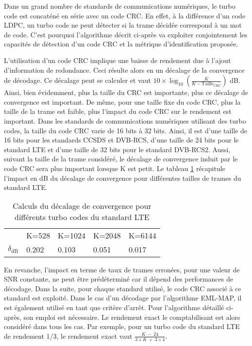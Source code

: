 Dans un grand nombre de standards de communications numériques, le turbo code est concaténé en série avec un code CRC. En 
effet, à la différence d'un code LDPC, un turbo code ne peut détecter si la trame décidée correspond à un mot de code. 
C'est pourquoi l'algorithme  décrit ci-après va exploiter conjointement les capacités de détection d'un code CRC et la métrique 
d'identification proposée.

L'utilisation d'un code CRC implique une baisse de rendement due à l'ajout d'information de redondance. Ceci résulte alors 
en un décalage de la convergence de décodage. Ce décalage peut se calculer et vaut $10\times \log_{10}\left(\frac{K}{K-\text{Taille}_\text{CRC}}\right)$ dB.
Ainsi, bien évidemment, plus la taille du CRC est importante, plus ce décalage de convergence est important. De même,
pour une taille fixe du code CRC, plus la taille de la trame est faible, plus l'impact du code CRC sur le rendement est 
important. Dans les 
standards de communications numériques utilisant des turbo codes, la taille du code CRC varie de 16 bits à 32 bits.
Ainsi, il est d'une taille de 16 bits pour les standards CCSDS et DVB-RCS, d'une taille de 24 bits pour le standard LTE et d'une taille
de 32 bits pour le standard DVB-RCS2. Aussi, suivant la taille de la trame considéré, le décalage de convergence induit par le code 
CRC sera plus important lorsque K est petit. Le tableau \ref{tab:crcShift} récapitule l'impact en dB du décalage de convergence
pour différentes tailles de trames du standard LTE. 

\begin{table}[!b]
    \centering
    \caption{Calculs du décalage de convergence pour différents turbo codes du standard LTE}
    \label{tab:crcShift}
        \begin{tabular}{rllll}
            \toprule
            		& K=528 & K=1024 & K=2048 & K=6144 \\
            \cmidrule(l){2-2}\cmidrule(l){3-3}\cmidrule(l){4-4}\cmidrule(l){5-5}
            $\delta_\text{dB}$ & 0.202 & 0.103 & 0.051 & 0.017 \\
            \bottomrule
        \end{tabular}%
\end{table}

En revanche, l'impact en terme de taux de trames erronées, pour une valeur de SNR constante, ne peut être prédéterminé car il 
dépend des performances de décodage.
Dans la suite, pour chaque standard utilisé, le code CRC associé à ce standard est exploité. Dans le cas d'un décodage par l'algorithme 
EML-MAP, il est également utilisé en tant que critère d'arrêt. Pour l'algorithme détaillé ci-après, son emploi est nécessaire. Le rendement exact
le comptabilisant est alors considéré dans tous les cas. Par exemple, pour un turbo code du standard LTE
de rendement 1/3, le rendement exact vaut  $\frac{K~-~24}{3\times K~+~3\times 4}$.

